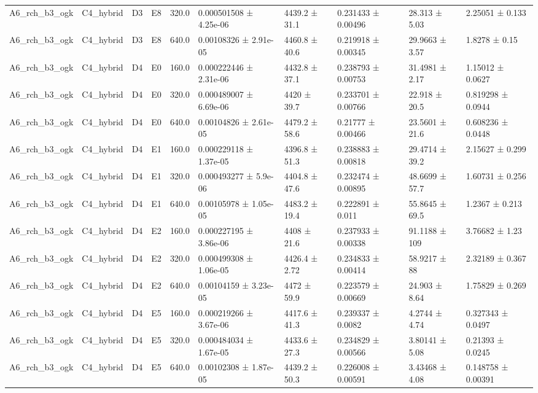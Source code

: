 \begin{table}
\begin{tabular}{llllllllll}
A6\_rch\_b3\_ogk & C4\_hybrid & D3 & E8 & 320.0 & 0.000501508 ± 4.25e-06 & 4439.2 ± 31.1 & 0.231433 ± 0.00496 & 28.313 ± 5.03 & 2.25051 ± 0.133 \\
A6\_rch\_b3\_ogk & C4\_hybrid & D3 & E8 & 640.0 & 0.00108326 ± 2.91e-05 & 4460.8 ± 40.6 & 0.219918 ± 0.00345 & 29.9663 ± 3.57 & 1.8278 ± 0.15 \\
A6\_rch\_b3\_ogk & C4\_hybrid & D4 & E0 & 160.0 & 0.000222446 ± 2.31e-06 & 4432.8 ± 37.1 & 0.238793 ± 0.00753 & 31.4981 ± 2.17 & 1.15012 ± 0.0627 \\
A6\_rch\_b3\_ogk & C4\_hybrid & D4 & E0 & 320.0 & 0.000489007 ± 6.69e-06 & 4420 ± 39.7 & 0.233701 ± 0.00766 & 22.918 ± 20.5 & 0.819298 ± 0.0944 \\
A6\_rch\_b3\_ogk & C4\_hybrid & D4 & E0 & 640.0 & 0.00104826 ± 2.61e-05 & 4479.2 ± 58.6 & 0.21777 ± 0.00466 & 23.5601 ± 21.6 & 0.608236 ± 0.0448 \\
A6\_rch\_b3\_ogk & C4\_hybrid & D4 & E1 & 160.0 & 0.000229118 ± 1.37e-05 & 4396.8 ± 51.3 & 0.238883 ± 0.00818 & 29.4714 ± 39.2 & 2.15627 ± 0.299 \\
A6\_rch\_b3\_ogk & C4\_hybrid & D4 & E1 & 320.0 & 0.000493277 ± 5.9e-06 & 4404.8 ± 47.6 & 0.232474 ± 0.00895 & 48.6699 ± 57.7 & 1.60731 ± 0.256 \\
A6\_rch\_b3\_ogk & C4\_hybrid & D4 & E1 & 640.0 & 0.00105978 ± 1.05e-05 & 4483.2 ± 19.4 & 0.222891 ± 0.011 & 55.8645 ± 69.5 & 1.2367 ± 0.213 \\
A6\_rch\_b3\_ogk & C4\_hybrid & D4 & E2 & 160.0 & 0.000227195 ± 3.86e-06 & 4408 ± 21.6 & 0.237933 ± 0.00338 & 91.1188 ± 109 & 3.76682 ± 1.23 \\
A6\_rch\_b3\_ogk & C4\_hybrid & D4 & E2 & 320.0 & 0.000499308 ± 1.06e-05 & 4426.4 ± 2.72 & 0.234833 ± 0.00414 & 58.9217 ± 88 & 2.32189 ± 0.367 \\
A6\_rch\_b3\_ogk & C4\_hybrid & D4 & E2 & 640.0 & 0.00104159 ± 3.23e-05 & 4472 ± 59.9 & 0.223579 ± 0.00669 & 24.903 ± 8.64 & 1.75829 ± 0.269 \\
A6\_rch\_b3\_ogk & C4\_hybrid & D4 & E5 & 160.0 & 0.000219266 ± 3.67e-06 & 4417.6 ± 41.3 & 0.239337 ± 0.0082 & 4.2744 ± 4.74 & 0.327343 ± 0.0497 \\
A6\_rch\_b3\_ogk & C4\_hybrid & D4 & E5 & 320.0 & 0.000484034 ± 1.67e-05 & 4433.6 ± 27.3 & 0.234829 ± 0.00566 & 3.80141 ± 5.08 & 0.21393 ± 0.0245 \\
A6\_rch\_b3\_ogk & C4\_hybrid & D4 & E5 & 640.0 & 0.00102308 ± 1.87e-05 & 4439.2 ± 50.3 & 0.226008 ± 0.00591 & 3.43468 ± 4.08 & 0.148758 ± 0.00391 \\

\end{tabular}
\end{table}
